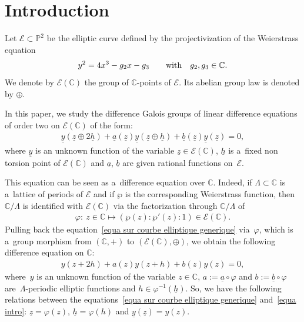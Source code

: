 \documentclass[pdftex]{sigma}
\numberwithin{equation}{section}
\begin{document}

\renewcommand{\thefootnote}{\arabic{footnote}}
\setcounter{footnote}{0}

\section{Introduction}

Let $\mathcal{E} \subset \mathbb{P}^{2}$ be the elliptic curve def\/ined by the projectivization of the Weierstrass
equation
\begin{gather}
\label{Weierstrass equation}
y^{2}=4x^{3}-g_{2}x-g_{3} \qquad \hbox{with} \quad g_{2},g_{3} \in \mathbb C.
\end{gather}
We denote by $\mathcal{E}(\mathbb C)$ the group of $\mathbb C$-points of $\mathcal{E}$.
Its abelian group law is denoted by $\oplus$.

In this paper, we study the dif\/ference Galois groups of linear dif\/ference equations of order two on $\mathcal{E}(\mathbb
C)$ of the form:
\begin{gather}
\label{equa sur courbe elliptique generique}
\underline{y}(\underline{z} \oplus 2\underline{h}) + \underline{a}(\underline{z}) \underline{y}(\underline{z}\oplus
\underline{h}) + \underline{b}(\underline{z}) \underline{y}(\underline{z}) =0,
\end{gather}
where $\underline{y}$ is an unknown function of the variable $\underline{z} \in \mathcal{E}(\mathbb C)$, $\underline{h}$
is a~f\/ixed non torsion point of $\mathcal{E}(\mathbb C)$ and $\underline{a}$, $\underline{b}$ are given rational functions
on~$\mathcal{E}$.

This equation can be seen as a~dif\/ference equation over $\mathbb C$.
Indeed, if $\Lambda \subset \mathbb C$ is a~lattice of periods of $\mathcal{E}$ and if $\wp$ is the corresponding
Weierstrass function, then $\mathbb C/\Lambda$ is identif\/ied with $\mathcal{E}(\mathbb C)$ via the factorization through
$\mathbb C/\Lambda$ of
\begin{gather*}
\varphi: \ z \in \mathbb C \mapsto (\wp(z):\wp'(z):1) \in \mathcal{E}(\mathbb C).
\end{gather*}
Pulling back the equation~\eqref{equa sur courbe elliptique generique} via~$\varphi$, which is a~group morphism from
$(\mathbb C, +)$ to $(\mathcal{E}(\mathbb C),\oplus)$, we obtain the following dif\/ference equation on $\mathbb C$:
\begin{gather}
\label{equa intro}
y(z+2h) + a(z) y(z+h) + b(z)y(z) =0,
\end{gather}
where~$y$ is an unknown function of the variable $z\in \mathbb C$, $a:=\underline{a} \circ \varphi$ and
$b:=\underline{b} \circ \varphi$ are~$\Lambda$-periodic elliptic functions and ${h \in \varphi^{-1}(\underline{h})}$.
So, we have the following relations between the equations~\eqref{equa sur courbe elliptique generique} and~\eqref{equa
intro}: $\underline{z} = \varphi(z)$, $\underline{h}=\varphi(h)$ and $\underline{y}(\underline{z})= y(z)$.
\end{document}
